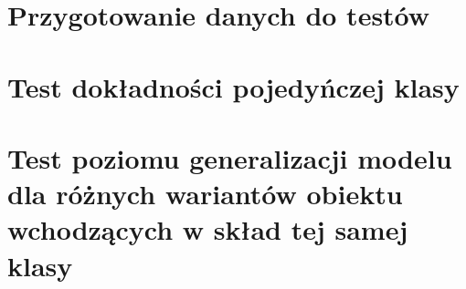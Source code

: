 \section{Przygotowanie danych do testów}
\label{sec:test-wspoldzielony}


\section{Test dokładności pojedyńczej klasy}
\label{sec:test-1}


\section{Test poziomu generalizacji modelu dla różnych wariantów obiektu wchodzących w skład tej samej klasy}
\label{sec:test-2}


